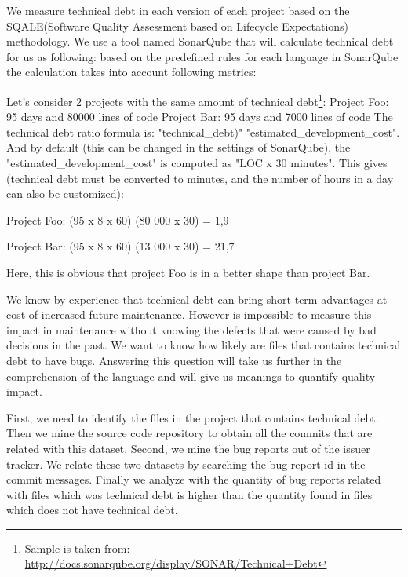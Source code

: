 We measure technical debt in each version of each project based on the SQALE(Software Quality Assessment based on Lifecycle Expectations) methodology. We use a tool named SonarQube that will calculate technical debt for us as following: based on the predefined rules for each language in SonarQube the calculation takes into account following metrics:


Let's consider 2 projects with the same amount of technical debt\footnote{Sample is taken from: \url{ http://docs.sonarqube.org/display/SONAR/Technical+Debt}}:
Project Foo: 95 days and 80000 lines of code
Project Bar: 95 days and 7000 lines of code
The technical debt ratio formula is: "technical\_debt)" \/ "estimated\_development\_cost". And by default (this can be changed in the settings of SonarQube), the "estimated\_development\_cost" is computed as "LOC x 30 minutes". This gives (technical debt must be converted to minutes, and the number of hours in a day can also be customized):
\par
Project Foo: (95 x 8 x 60) \/ (80 000 x 30) = 1,9%
\par
Project Bar: (95 x 8 x 60) \/ (13 000 x 30) = 21,7%
\par
Here, this is obvious that project Foo is in a better shape than project Bar.

\noindent{\rqiii}

 We know by experience that technical debt can bring short term advantages at cost of increased future maintenance. However is impossible to measure this impact in maintenance without knowing the defects that were caused by bad decisions in the past. We want to know how likely are files that contains technical debt to have bugs. Answering this question will take us further in the comprehension of the language and will give us meanings to quantify quality impact. 


 First, we need to identify the files in the project that contains technical debt. Then we mine the source code repository to obtain all the commits that are related with this dataset. Second, we mine the bug reports out of the issuer tracker. We relate these two datasets by searching the bug report id in  the commit messages. Finally we analyze with the quantity of bug reports related with files which was technical debt is higher than the quantity found in files which does not have technical debt. 
